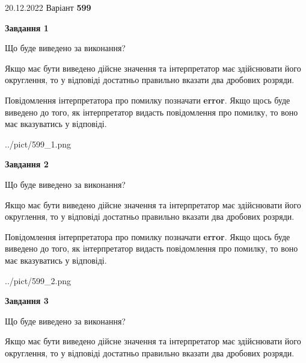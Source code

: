 \documentclass[12pt, ukrainian]{article}
\begin{document}
{20.12.2022 Варіант \No \textbf { 599 }\par}
{
\begin {Large}

{\begin {center}\textbf{Завдання 1}\end {center}}\par
Що буде виведено за виконання? \par

Якщо має бути виведено дійсне значення та інтерпретатор має здійснювати його округлення, 
то у відповіді достатньо правильно вказати два дробових розряди.

Повідомлення інтерпретатора про помилку позначати \textbf{error}.
Якщо щось буде виведено до того, як інтерпретатор видасть повідомлення про помилку, 
то воно має вказуватись у відповіді. \par

\begin{center}
	{../pict/599_1.png}
\end{center}
\newpage

{\begin {center}\textbf{Завдання 2}\end {center}}\par
Що буде виведено за виконання? \par

Якщо має бути виведено дійсне значення та інтерпретатор має здійснювати його округлення, 
то у відповіді достатньо правильно вказати два дробових розряди.

Повідомлення інтерпретатора про помилку позначати \textbf{error}.
Якщо щось буде виведено до того, як інтерпретатор видасть повідомлення про помилку, 
то воно має вказуватись у відповіді. \par

\begin{center}
	{../pict/599_2.png}
\end{center}
\newpage

{\begin {center}\textbf{Завдання 3}\end {center}}\par
Що буде виведено за виконання? \par

Якщо має бути виведено дійсне значення та інтерпретатор має здійснювати його округлення, 
то у відповіді достатньо правильно вказати два дробових розряди.


\end{Large}}
\end{document}
